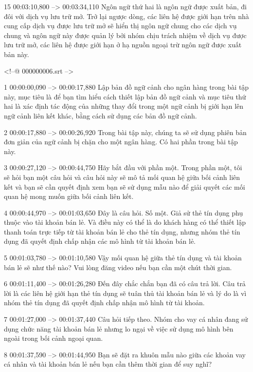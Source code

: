 15
00:03:10,800 --> 00:03:34,110
Ngôn ngữ thứ hai là ngôn ngữ được xuất bản, đi đôi với dịch vụ lưu trữ mở.  Trở lại ngược dòng, các liên hệ được giới hạn trên nhà cung cấp dịch vụ được lưu trữ mở sẽ hiển thị ngôn ngữ chung cho các dịch vụ chung và ngôn ngữ này được quản lý bởi nhóm chịu trách nhiệm về dịch vụ được lưu trữ mở, các liên hệ được giới hạn ở hạ nguồn ngoại trừ ngôn ngữ được xuất bản này.

<!--@ 000000006.srt -->

1
00:00:00,090 --> 00:00:17,880
Lập bản đồ ngữ cảnh cho ngân hàng trong bài tập này, mục tiêu là để bạn tìm hiểu cách thiết lập bản đồ ngữ cảnh và mục tiêu thứ hai là xác định tác động của những thay đổi trong một ngữ cảnh bị giới hạn lên ngữ cảnh liên kết khác, bằng cách sử dụng các bản đồ ngữ cảnh.

2
00:00:17,880 --> 00:00:26,920
Trong bài tập này, chúng ta sẽ sử dụng phiên bản đơn giản của ngữ cảnh bị chặn cho một ngân hàng.  Có hai phần trong bài tập này.

3
00:00:27,120 --> 00:00:44,750
Hãy bắt đầu với phần một.  Trong phần một, tôi sẽ hỏi bạn một câu hỏi và câu hỏi này sẽ mô tả mối quan hệ giữa bối cảnh liên kết và bạn sẽ cần quyết định xem bạn sẽ sử dụng mẫu nào để giải quyết các mối quan hệ mong muốn giữa bối cảnh liên kết.

4
00:00:44,970 --> 00:01:03,650
Đây là câu hỏi.  Số một.  Giả sử thẻ tín dụng phụ thuộc vào tài khoản bán lẻ.  Và điều này có thể là do khách hàng có thể thiết lập thanh toán trực tiếp từ tài khoản bán lẻ cho thẻ tín dụng, nhưng nhóm thẻ tín dụng đã quyết định chấp nhận các mô hình từ tài khoản bán lẻ.

5
00:01:03,780 --> 00:01:10,580
Vậy mối quan hệ giữa thẻ tín dụng và tài khoản bán lẻ sẽ như thế nào?  Vui lòng đăng video nếu bạn cần một chút thời gian.

6
00:01:11,400 --> 00:01:26,280
Đến đây chắc chắn bạn đã có câu trả lời.  Câu trả lời là các liên hệ giới hạn thẻ tín dụng sẽ tuân thủ tài khoản bán lẻ và lý do là vì nhóm thẻ tín dụng đã quyết định chấp nhận mô hình từ tài khoản.

7
00:01:27,000 --> 00:01:37,440
Câu hỏi tiếp theo.  Nhóm cho vay cá nhân đang sử dụng chức năng tài khoản bán lẻ nhưng lo ngại về việc sử dụng mô hình bên ngoài trong bối cảnh ngoại quan.

8
00:01:37,590 --> 00:01:44,950
Bạn sẽ đặt ra khuôn mẫu nào giữa các khoản vay cá nhân và tài khoản bán lẻ nếu bạn cần thêm thời gian để suy nghĩ?

